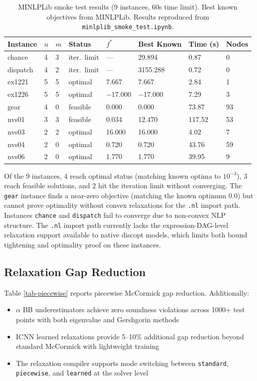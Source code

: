 \documentclass[12pt,preprint]{article}
\begin{document}
\begin{table}[htbp]
\centering
\begin{tabular}{llllllll}
\toprule
Instance & $n$ & $m$ & Status & $f^*$ & Best Known & Time (s) & Nodes \\
\midrule
chance & 4 & 3 & iter.~limit & --- & 29.894 & 0.87 & 0 \\
dispatch & 4 & 2 & iter.~limit & --- & 3155.288 & 0.72 & 0 \\
ex1221 & 5 & 5 & optimal & 7.667 & 7.667 & 2.84 & 1 \\
ex1226 & 5 & 5 & optimal & $-$17.000 & $-$17.000 & 7.29 & 3 \\
gear & 4 & 0 & feasible & 0.000 & 0.000 & 73.87 & 93 \\
nvs01 & 3 & 3 & feasible & 0.034 & 12.470 & 117.52 & 53 \\
nvs03 & 2 & 2 & optimal & 16.000 & 16.000 & 4.02 & 7 \\
nvs04 & 2 & 0 & optimal & 0.720 & 0.720 & 43.76 & 59 \\
nvs06 & 2 & 0 & optimal & 1.770 & 1.770 & 39.95 & 9 \\
\bottomrule
\end{tabular}
\caption{MINLPLib smoke test results (9 instances, 60s time limit). Best known objectives from MINLPLib. Results reproduced from \texttt{minlplib\_smoke\_test.ipynb}.}
\label{tab-minlplib}
\end{table}


Of the 9 instances, 4 reach optimal status (matching known optima to $10^{-3}$), 3 reach feasible solutions, and 2 hit the iteration limit without converging. The \texttt{gear} instance finds a near-zero objective (matching the known optimum $0.0$) but cannot prove optimality without convex relaxations for the \texttt{.nl} import path. Instances \texttt{chance} and \texttt{dispatch} fail to converge due to non-convex NLP structure. The \texttt{.nl} import path currently lacks the expression-DAG-level relaxation support available to native discopt models, which limits both bound tightening and optimality proof on these instances.

\subsection{Relaxation Gap Reduction}
\label{org-relaxation-gap-reduction}
Table \ref{tab-piecewise} reports piecewise McCormick gap reduction. Additionally:


\begin{itemize}
\item $\alpha$ BB underestimators achieve zero soundness violations across 1000+ test points with both eigenvalue and Gershgorin methods

\item ICNN learned relaxations provide 5--10\% additional gap reduction beyond standard McCormick with lightweight training

\item The relaxation compiler supports mode switching between \texttt{standard}, \texttt{piecewise}, and \texttt{learned} at the solver level

\end{itemize}
\end{document}
